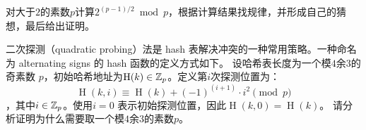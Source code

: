 \begin{problemset}
 \item 对大于$2$的素数$ p $计算$2^{(p-1)/2} \bmod p$，根据计算结果找规律，并形成自己的猜想，最后给出证明。
 
 \item 二次探测（quadratic probing）法是 hash 表解决冲突的一种常用策略。一种命名为 alternating signs 的 hash 函数的定义方式如下。
 设哈希表长度为一个模$4$余$3$的奇素数 $p$，初始哈希地址为$\operatorname{H}(k) \in {\mathbb Z}_p$。定义第$i$次探测位置为：
 \[\operatorname{H}(k,i) \equiv \operatorname{H}(k) + (-1)^{(i+1)} \cdot i^2 \pmod{p}\]，其中$i\in {\mathbb Z}_p$。使用$i=0$ 表示初始探测位置，因此$\operatorname{H}(k, 0) = \operatorname{H}(k)$。
 请分析证明为什么需要取一个模$4$余$3$的素数$p$。
 
 \end{problemset}
 
 
